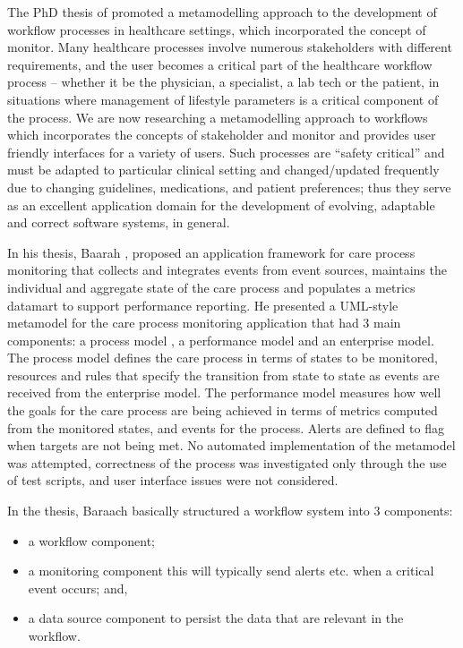 \documentclass[a4paper]{llncs}
\begin{document}
The PhD thesis of \cite{Baarah} promoted a metamodelling approach to the development of workflow processes in healthcare settings, which incorporated the concept of monitor.  Many healthcare 
processes involve numerous stakeholders with different requirements, and the user becomes a critical part of the healthcare workflow process – whether it be the physician, a specialist, 
a lab tech or the patient, in situations where management of lifestyle parameters is a critical component of the process.  We are now researching a metamodelling approach to workflows which 
incorporates the concepts of stakeholder and monitor and provides user friendly interfaces for a variety of users.  Such processes are “safety critical” and must be adapted to particular 
clinical setting and changed/updated frequently due to changing guidelines, medications, and patient preferences; thus they serve as an excellent application domain for the development of 
evolving, adaptable and correct software systems, in general. 

In his thesis, Baarah  \cite{Baarah}, proposed an application framework for care process monitoring that collects and integrates events from event sources, maintains the individual and aggregate state 
of the care process and populates a metrics datamart to support performance reporting.  He presented a UML-style metamodel for the care process monitoring application that had 3 main components: 
a process model , a performance model and an enterprise model.  The process model defines the care process in terms of states to be monitored, resources and rules that specify the transition from 
state to state as events are received from the enterprise model.  The performance model measures how well the goals for the care process are being achieved in terms of metrics computed from 
the monitored states, and events for the process. Alerts are defined to flag when targets are not being met.  No automated implementation of the metamodel was attempted, correctness of the 
process was investigated only through the use of  test scripts,  and user interface issues were not considered.  

 
In the thesis, Baraach basically structured a workflow system into 3 components: 
\begin{itemize}
 \item a workflow component; 
 \item a monitoring component this will typically send alerts etc. when a critical event occurs; and, 
 \item a data source component to persist the data that are relevant in the workflow.
\end{itemize}
\end{document}
